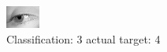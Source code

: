 \begin{figure}[h!]
\begin{center}
\includegraphics[width=0.60\columnwidth]{figures/ID2912_class_3_target_4.png}
\end{center}
\caption{ Classification: 3 actual target: 4}
\label{fig:ID2912_class_3_target_4}
\end{figure}
